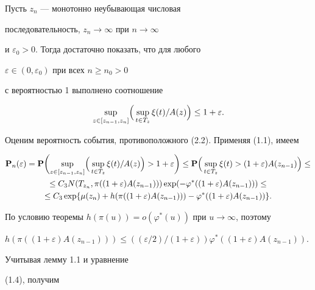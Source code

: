  


\begin{pf} Пусть $z_n$ --- монотонно неубывающая числовая 


последовательность, $z_n\to\infty$ при $n\to\infty$ 


и $\varepsilon_0>0$. Тогда достаточно показать, что для любого 


$\varepsilon\in(0,\varepsilon_0)$ при всех $n\ge n_0>0$ 


с вероятностью 1 выполнено соотношение 


\begin{equation} 


\sup_{z\in[z_{n-1},z_n]}\Bigl(\, 


\sup_{t\in T_z}\xi(t)/A(z)\Bigr)\le 1+\varepsilon. 


\end{equation} 


Оценим вероятность события, противоположного (2.2). Применяя (1.1), имеем 


\begin{gather*} 


{\bold P}_n(\varepsilon)={\bold P}\biggl(\sup_{z\in[z_{n-1},z_n]} 


\Bigl(\,\sup_{t\in T_z}\xi(t)/A(z)\Bigr)>1+\varepsilon\biggr)\le 


{\bold P}\Bigl(\,\sup_{t\in T_z}\xi(t)>(1+\varepsilon) 


A(z_{n-1})\Bigr)\le\\ 


\le C_3N(T_{z_n},\pi((1+\varepsilon)A(z_{n-1}))) 


\exp(-\varphi^*((1+\varepsilon)A(z_{n-1})))\le \\ 


\le C_3\exp\{\mu(z_n)+h(\pi((1+\varepsilon)A(z_{n-1}))) 


-\varphi^*((1+\varepsilon)A(z_{n-1}))\}. 


\end{gather*} 


По условию теоремы $h(\pi(u))=o(\varphi^*(u))$ при $u\to\infty$, поэтому 


$h(\pi((1+\varepsilon)A(z_{n-1})))\le((\varepsilon/2)/(1+\varepsilon)) 


\varphi^*((1+\varepsilon)A(z_{n-1}))$. 


Учитывая лемму 1.1 и уравнение 


(1.4), получим 


\begin{gather*} 



\end{gather*}
\end{pf}

